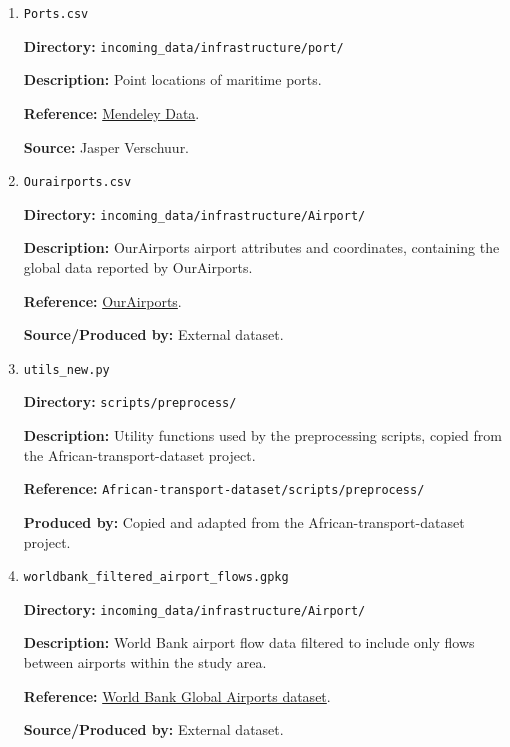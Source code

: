 \documentclass[11pt,a4paper]{article}
\begin{document}
\begin{enumerate}
\medskip

\item \texttt{Ports.csv}\par
\textbf{Directory:} \texttt{incoming\_data/infrastructure/port/}\par
\textbf{Description:} Point locations of maritime ports.\par
\textbf{Reference:} \href{https://data.mendeley.com/datasets/kdyt24tsh5/1}{Mendeley Data}.\par
\textbf{Source:} Jasper Verschuur.\par

\medskip

\item \texttt{Ourairports.csv}\par
\textbf{Directory:} \texttt{incoming\_data/infrastructure/Airport/}\par
\textbf{Description:} OurAirports airport attributes and coordinates, containing the global data reported by OurAirports.\par
\textbf{Reference:} \href{https://ourairports.com/data/}{OurAirports}.\par
\textbf{Source/Produced by:} External dataset.\par

\medskip

\item \texttt{utils\_new.py}\par
\textbf{Directory:} \texttt{scripts/preprocess/}\par
\textbf{Description:} Utility functions used by the preprocessing scripts, copied from the African-transport-dataset project.\par
\textbf{Reference:} \texttt{African-transport-dataset/scripts/preprocess/}\par
\textbf{Produced by:} Copied and adapted from the African-transport-dataset project.\par

\medskip

\item \texttt{worldbank\_filtered\_airport\_flows.gpkg}\par
\textbf{Directory:} \texttt{incoming\_data/infrastructure/Airport/}\par
\textbf{Description:} World Bank airport flow data filtered to include only flows between airports within the study area.\par
\textbf{Reference:} \href{https://datacatalog.worldbank.org/search/dataset/0038117/global-airports}{World Bank Global Airports dataset}.\par
\textbf{Source/Produced by:} External dataset.\par


\end{enumerate}
\end{document}
